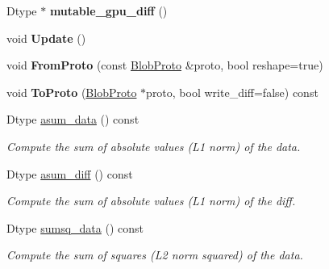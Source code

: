 \begin{DoxyCompactItemize}
\item 
\mbox{\label{classcaffe_1_1_blob_a8d230bed098a5ee31559df0b8e2db252}} 
Dtype $\ast$ {\bfseries mutable\+\_\+gpu\+\_\+diff} ()
\item 
\mbox{\label{classcaffe_1_1_blob_afe035d7b60c56e4aed2a18296e8ffdc5}} 
void {\bfseries Update} ()
\item 
\mbox{\label{classcaffe_1_1_blob_a0a95f882414ba0a11d674b134478476d}} 
void {\bfseries From\+Proto} (const \mbox{\hyperlink{classcaffe_1_1_blob_proto}{Blob\+Proto}} \&proto, bool reshape=true)
\item 
\mbox{\label{classcaffe_1_1_blob_adec156c0682f12c5bf0a3bf221c1a023}} 
void {\bfseries To\+Proto} (\mbox{\hyperlink{classcaffe_1_1_blob_proto}{Blob\+Proto}} $\ast$proto, bool write\+\_\+diff=false) const
\item 
\mbox{\label{classcaffe_1_1_blob_aa06094adb9337a7d67f7049a1f2ede54}} 
Dtype \mbox{\hyperlink{classcaffe_1_1_blob_aa06094adb9337a7d67f7049a1f2ede54}{asum\+\_\+data}} () const
\begin{DoxyCompactList}\small\item\em Compute the sum of absolute values (L1 norm) of the data. \end{DoxyCompactList}\item 
\mbox{\label{classcaffe_1_1_blob_a1bf366edeb71ae6a76d4177fef3879ec}} 
Dtype \mbox{\hyperlink{classcaffe_1_1_blob_a1bf366edeb71ae6a76d4177fef3879ec}{asum\+\_\+diff}} () const
\begin{DoxyCompactList}\small\item\em Compute the sum of absolute values (L1 norm) of the diff. \end{DoxyCompactList}\item 
\mbox{\label{classcaffe_1_1_blob_a2ea640466fc339a02dabba4e8a1f0de2}} 
Dtype \mbox{\hyperlink{classcaffe_1_1_blob_a2ea640466fc339a02dabba4e8a1f0de2}{sumsq\+\_\+data}} () const
\begin{DoxyCompactList}\small\item\em Compute the sum of squares (L2 norm squared) of the data. \end{DoxyCompactList}\item 

\end{DoxyCompactItemize}
